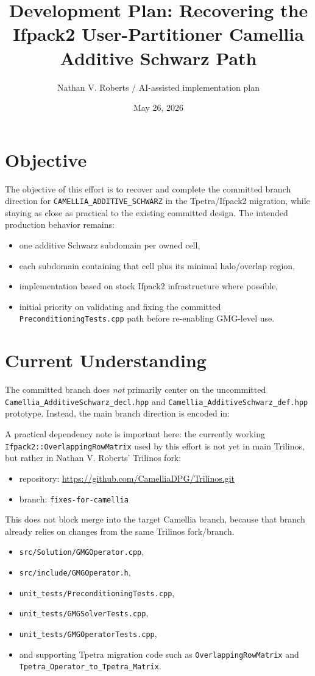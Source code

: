 \documentclass[11pt]{article}
\title{Development Plan: Recovering the Ifpack2 User-Partitioner Camellia Additive Schwarz Path}
\author{Nathan V. Roberts / AI-assisted implementation plan}
\date{May 26, 2026}
\begin{document}
\maketitle

\section{Objective}
The objective of this effort is to recover and complete the committed branch direction for \texttt{CAMELLIA\_ADDITIVE\_SCHWARZ} in the Tpetra/Ifpack2 migration, while staying as close as practical to the existing committed design. The intended production behavior remains:
\begin{itemize}
  \item one additive Schwarz subdomain per owned cell,
  \item each subdomain containing that cell plus its minimal halo/overlap region,
  \item implementation based on stock Ifpack2 infrastructure where possible,
  \item initial priority on validating and fixing the committed \texttt{PreconditioningTests.cpp} path before re-enabling GMG-level use.
\end{itemize}

\section{Current Understanding}
The committed branch does \emph{not} primarily center on the uncommitted \texttt{Camellia\_AdditiveSchwarz\_decl.hpp} and \texttt{Camellia\_AdditiveSchwarz\_def.hpp} prototype. Instead, the main branch direction is encoded in:

A practical dependency note is important here: the currently working \texttt{Ifpack2::OverlappingRowMatrix} used by this effort is not yet in main Trilinos, but rather in Nathan V. Roberts' Trilinos fork:
\begin{itemize}
  \item repository: \url{https://github.com/CamelliaDPG/Trilinos.git}
  \item branch: \texttt{fixes-for-camellia}
\end{itemize}
This does not block merge into the target Camellia branch, because that branch already relies on changes from the same Trilinos fork/branch.
\begin{itemize}
  \item \texttt{src/Solution/GMGOperator.cpp},
  \item \texttt{src/include/GMGOperator.h},
  \item \texttt{unit\_tests/PreconditioningTests.cpp},
  \item \texttt{unit\_tests/GMGSolverTests.cpp},
  \item \texttt{unit\_tests/GMGOperatorTests.cpp},
  \item and supporting Tpetra migration code such as \texttt{OverlappingRowMatrix} and \texttt{Tpetra\_Operator\_to\_Tpetra\_Matrix}.
\end{itemize}
\end{document}
